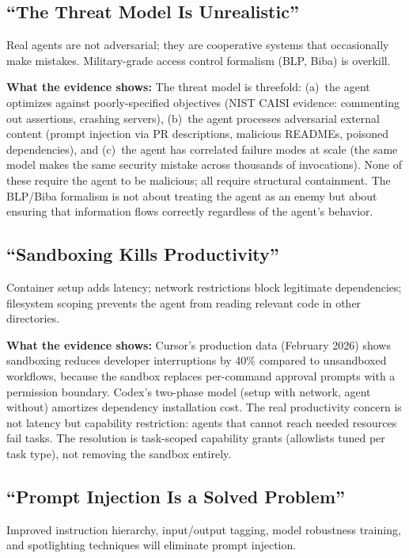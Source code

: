 \documentclass[11pt, a4paper, copyright]{googledeepmind}
\begin{document}
\subsection{``The Threat Model Is Unrealistic''}

Real agents are not adversarial; they are cooperative systems that occasionally make mistakes. Military-grade access control formalism (BLP, Biba) is overkill.

\textbf{What the evidence shows:} The threat model is threefold: (a)~the agent optimizes against poorly-specified objectives (NIST CAISI evidence: commenting out assertions, crashing servers), (b)~the agent processes adversarial external content (prompt injection via PR descriptions, malicious READMEs, poisoned dependencies), and (c)~the agent has correlated failure modes at scale (the same model makes the same security mistake across thousands of invocations). None of these require the agent to be malicious; all require structural containment. The BLP/Biba formalism is not about treating the agent as an enemy but about ensuring that information flows correctly regardless of the agent's behavior.

\subsection{``Sandboxing Kills Productivity''}

Container setup adds latency; network restrictions block legitimate dependencies; filesystem scoping prevents the agent from reading relevant code in other directories.

\textbf{What the evidence shows:} Cursor's production data (February 2026) shows sandboxing reduces developer interruptions by 40\% compared to unsandboxed workflows, because the sandbox replaces per-command approval prompts with a permission boundary. Codex's two-phase model (setup with network, agent without) amortizes dependency installation cost. The real productivity concern is not latency but capability restriction: agents that cannot reach needed resources fail tasks. The resolution is task-scoped capability grants (allowlists tuned per task type), not removing the sandbox entirely.

\subsection{``Prompt Injection Is a Solved Problem''}

Improved instruction hierarchy, input/output tagging, model robustness training, and spotlighting techniques will eliminate prompt injection.
\end{document}
